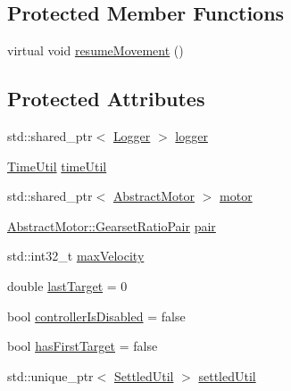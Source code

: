 \subsection*{Protected Member Functions}
\begin{DoxyCompactItemize}
\item 
virtual void \mbox{\hyperlink{classokapi_1_1AsyncVelIntegratedController_ae017d0031a2ba76d199039cbf7a1465f}{resume\+Movement}} ()
\end{DoxyCompactItemize}
\subsection*{Protected Attributes}
\begin{DoxyCompactItemize}
\item 
std\+::shared\+\_\+ptr$<$ \mbox{\hyperlink{classokapi_1_1Logger}{Logger}} $>$ \mbox{\hyperlink{classokapi_1_1AsyncVelIntegratedController_afa4028d0303fcfcb7aa7f280b6df663a}{logger}}
\item 
\mbox{\hyperlink{classokapi_1_1TimeUtil}{Time\+Util}} \mbox{\hyperlink{classokapi_1_1AsyncVelIntegratedController_a2cfa27f4610d93fa505a0c82f11c9d16}{time\+Util}}
\item 
std\+::shared\+\_\+ptr$<$ \mbox{\hyperlink{classokapi_1_1AbstractMotor}{Abstract\+Motor}} $>$ \mbox{\hyperlink{classokapi_1_1AsyncVelIntegratedController_a4160de7d42a6817cf037e6a7d91abf37}{motor}}
\item 
\mbox{\hyperlink{structokapi_1_1AbstractMotor_1_1GearsetRatioPair}{Abstract\+Motor\+::\+Gearset\+Ratio\+Pair}} \mbox{\hyperlink{classokapi_1_1AsyncVelIntegratedController_a76fcd4c095ff6202e0e9513f8081374d}{pair}}
\item 
std\+::int32\+\_\+t \mbox{\hyperlink{classokapi_1_1AsyncVelIntegratedController_ae6e7d75b066164832207df762b2928ef}{max\+Velocity}}
\item 
double \mbox{\hyperlink{classokapi_1_1AsyncVelIntegratedController_adeffae970b04bf2d484dd19e449810fb}{last\+Target}} = 0
\item 
bool \mbox{\hyperlink{classokapi_1_1AsyncVelIntegratedController_aed3ebba016794f5eb888edde33a929af}{controller\+Is\+Disabled}} = false
\item 
bool \mbox{\hyperlink{classokapi_1_1AsyncVelIntegratedController_acaf2cbb592c8011df80c5ce618bfb79b}{has\+First\+Target}} = false
\item 
std\+::unique\+\_\+ptr$<$ \mbox{\hyperlink{classokapi_1_1SettledUtil}{Settled\+Util}} $>$ \mbox{\hyperlink{classokapi_1_1AsyncVelIntegratedController_aa9890eed087ca10be20b6fc3936508b9}{settled\+Util}}
\end{DoxyCompactItemize}


